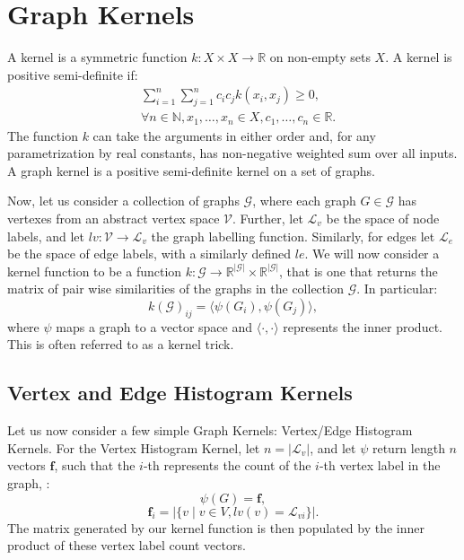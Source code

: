 \chapter{Graph Kernels}
\label{appendix:graph_kernels}

A kernel is a symmetric function $k: X \times X \rightarrow \mathbb{R}$ on
non-empty sets $X$. A kernel is positive semi-definite if:
\begin{align*}
	&\sum_{i=1}^{n} \sum_{j=1}^{n} c_i c_j k(x_i, x_j) \geq 0, \\
	&\forall n \in \mathbb{N}, x_1, \ldots, x_n \in X, c_1, \ldots, c_n \in \mathbb{R}. 
\end{align*}
The function $k$ can take the arguments in either order and, for any
parametrization by real constants, has non-negative weighted sum over all
inputs. A graph kernel is a positive semi-definite kernel on a set of graphs.

Now, let us consider a collection of graphs $\mathcal{G}$, where each graph $G
\in \mathcal{G}$ has vertexes from an abstract vertex space $\mathcal{V}$.
Further, let $\mathcal{L}_v$ be the space of node labels, and let $lv:
\mathcal{V} \rightarrow \mathcal{L}_v$ the graph labelling function. Similarly,
for edges let $\mathcal{L}_e$ be the space of edge labels, with a similarly
defined $le$. We will now consider a kernel function to be a function $k:
\mathcal{G} \rightarrow \mathbb{R}^{|\mathcal{G}|} \times
\mathbb{R}^{|\mathcal{G}|}$, that is one that returns the matrix of pair wise
similarities of the graphs in the collection $\mathcal{G}$. In particular:
\begin{equation}
\label{eq:kernel_general}
    k(\mathcal{G})_{ij} = \langle\psi(G_i), \psi(G_j)\rangle,
\end{equation}
%
where $\psi$ maps a graph to a vector space and $\langle\cdot,\cdot\rangle$
represents the inner product. This is often referred to as a kernel trick.

\section{Vertex and Edge Histogram Kernels}
\label{appendix:graph_kernels:histogram}
Let us now consider a few simple Graph Kernels: Vertex/Edge Histogram Kernels.
For the Vertex Histogram Kernel, let $n=|\mathcal{L}_v|$, and let $\psi$ return
length $n$ vectors $\mathbf{f}$, such that the $i$-th represents the count of
the $i$-th vertex label in the graph, \ie: 
\begin{equation}
    \psi(G) = \mathbf{f},
\end{equation}
\begin{equation}
    \mathbf{f}_i=|\{v \mid v \in V, lv(v) = \mathcal{L}_{vi}\}|.
\end{equation}
%
The matrix generated by our kernel function is then populated by the inner
product of these vertex label count vectors.

